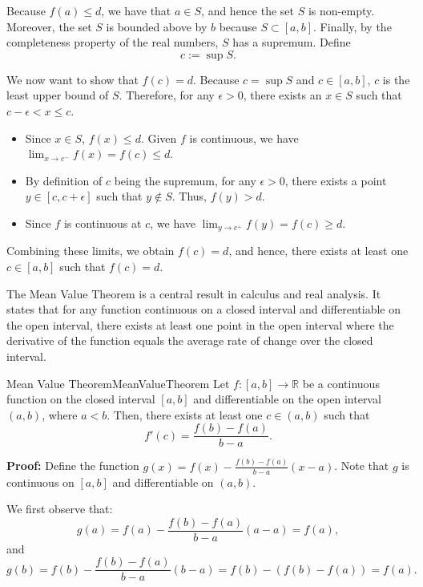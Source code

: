 Because \( f(a) \leq d \), we have that $a \in S$, and hence the set \( S \) is non-empty. Moreover, the set \( S \) is bounded above by \( b \) because \( S \subset [a, b] \). Finally, by the completeness property of the real numbers, \( S \) has a supremum. Define
$$ c := \sup S. $$

We now want to show that  \( f(c) = d \). Because \( c = \sup S \) and \( c \in [a, b] \), \( c \) is the least upper bound of \( S \). Therefore, for any \( \epsilon > 0 \), there exists an \( x \in S \) such that \( c - \epsilon < x \leq c \).
\begin{itemize}
    \item Since \( x \in S \), \( f(x) \leq d \). Given \( f \) is continuous, we have \( \lim_{x \to c^-} f(x) = f(c) \leq d \).
    \item By definition of \( c \) being the supremum, for any \( \epsilon > 0 \), there exists a point \( y \in [c, c + \epsilon] \) such that \( y \notin S \). Thus, \( f(y) > d \).
    \item Since \( f \) is continuous at \( c \), we have \( \lim_{y \to c^+} f(y) = f(c) \geq d \).
\end{itemize}
Combining these limits, we obtain \( f(c) = d \), and hence, there exists at least one \( c \in [a, b] \) such that \( f(c) = d \).

\Qed


\bigskip

The Mean Value Theorem is a central result in calculus and real analysis. It states that for any function continuous on a closed interval and differentiable on the open interval, there exists at least one point in the open interval where the derivative of the function equals the average rate of change over the closed interval. 

\bigskip


\begin{propColor}{Mean Value Theorem}{MeanValueTheorem}
    Let \( f: [a, b] \to \mathbb{R} \) be a continuous function on the closed interval \([a, b]\) and differentiable on the open interval \((a, b)\), where \( a < b \). Then, there exists at least one \( c \in (a, b) \) such that
    \[
    f'(c) = \frac{f(b) - f(a)}{b - a}.
    \]
\end{propColor}

\textbf{Proof:} Define the function \( g(x) = f(x) - \frac{f(b) - f(a)}{b - a}(x - a) \). Note that \( g \) is continuous on \([a, b]\) and differentiable on \((a, b)\).

We first observe that:
\[
g(a) = f(a) - \frac{f(b) - f(a)}{b - a}(a - a) = f(a),
\]
and
\[
g(b) = f(b) - \frac{f(b) - f(a)}{b - a}(b - a) = f(b) - (f(b) - f(a)) = f(a).
\]

